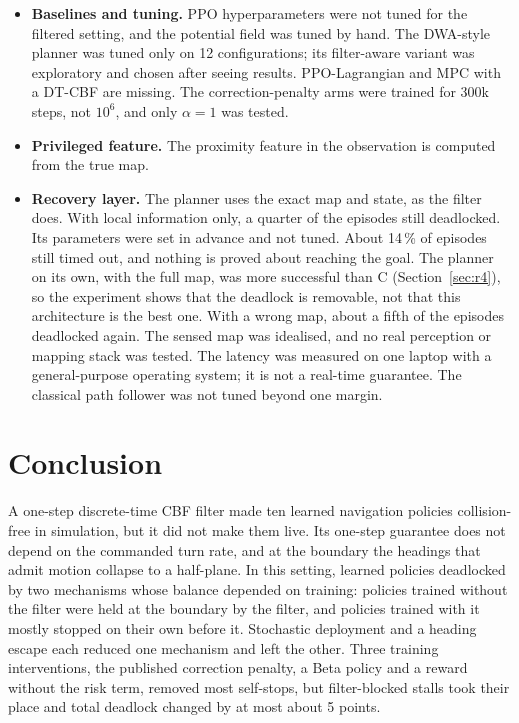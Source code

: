 \documentclass[11pt]{article}
\theoremstyle{definition}
\theoremstyle{remark}
\begin{document}
\begin{itemize}
  \item \textbf{Baselines and tuning.} PPO hyperparameters were not tuned for the filtered setting, and the potential field was tuned by hand. The DWA-style planner was tuned only on 12 configurations; its filter-aware variant was exploratory and chosen after seeing results. PPO-Lagrangian and MPC with a DT-CBF are missing. The correction-penalty arms were trained for 300k steps, not $10^6$, and only $\alpha=1$ was tested.
  \item \textbf{Privileged feature.} The proximity feature in the observation is computed from the true map.
  \item \textbf{Recovery layer.} The planner uses the exact map and state, as the filter does. With local information only, a quarter of the episodes still deadlocked. Its parameters were set in advance and not tuned. About 14\,\% of episodes still timed out, and nothing is proved about reaching the goal. The planner on its own, with the full map, was more successful than C (Section~\ref{sec:r4}), so the experiment shows that the deadlock is removable, not that this architecture is the best one. With a wrong map, about a fifth of the episodes deadlocked again. The sensed map was idealised, and no real perception or mapping stack was tested. The latency was measured on one laptop with a general-purpose operating system; it is not a real-time guarantee. The classical path follower was not tuned beyond one margin.
\end{itemize}

\section{Conclusion}
A one-step discrete-time CBF filter made ten learned navigation policies collision-free in simulation, but it did not make them live. Its one-step guarantee does not depend on the commanded turn rate, and at the boundary the headings that admit motion collapse to a half-plane. In this setting, learned policies deadlocked by two mechanisms whose balance depended on training: policies trained without the filter were held at the boundary by the filter, and policies trained with it mostly stopped on their own before it. Stochastic deployment and a heading escape each reduced one mechanism and left the other. Three training interventions, the published correction penalty, a Beta policy and a reward without the risk term, removed most self-stops, but filter-blocked stalls took their place and total deadlock changed by at most about 5 points.
\end{document}
